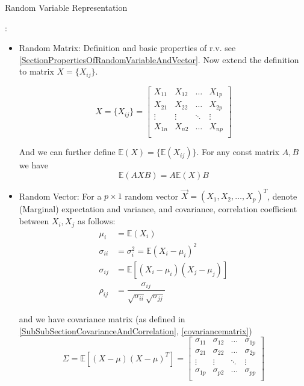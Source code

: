 \begin{point}
    \hypertarget{RandomVariableRepresentation}{Random Variable Representation}:
\end{point}
    \begin{itemize}[topsep=6pt,itemsep=4pt]
        \item Random Matrix: Definition and basic properties of r.v. see \autoref{SectionPropertiesOfRandomVariableAndVector}. Now extend the definition to matrix $ X=\{X_{ij}\} $. 
    
    \begin{equation}
        X=\{X_{ij}\}=\begin{bmatrix}
        X_{11}&X_{12}&\ldots&X_{1p}\\
        X_{21}&X_{22}&\ldots&X_{2p}\\
        \vdots&\vdots&\ddots&\vdots\\
        X_{1n}&X_{n2}&\ldots&X_{np}\\
        \end{bmatrix} 
    \end{equation}

    And we can further define $ \mathbb{E}(X)=\{\mathbb{E}(X_{ij})\} $.
    For any const matrix $ A,B $ we have
    \begin{equation}
        \mathbb{E}(AXB)=A\mathbb{E}(X)B 
    \end{equation}

    \item Random Vector: For a $ p\times 1 $ random vector $ \vec{X}=(X_{1},X_{2},\ldots,X_{p})^T  $, denote (Marginal) expectation and variance, and covariance, correlation coefficient between $ X_i,X_j $ as follows:
    \begin{align*}
        \mu_i&=\mathbb{E}(X_i)\\
        \sigma _{ii}&=\sigma_i ^2=\mathbb{E}(X_i-\mu_i)^2\\
        \sigma_{ij}&=\mathbb{E}[(X_i-\mu_i)(X_j-\mu_j)]\\
        \rho _{ij}&=\dfrac{\sigma _{ij}}{\sqrt{\sigma _{ii}}\sqrt{\sigma _{jj}}}
    \end{align*}
    
    and we have covariance matrix (as defined in \autoref{SubSubSectionCovarianceAndCorrelation}, \autoref{covariancematrix})
    \begin{equation}
        \Sigma =\mathbb{E}[(X-\mu)(X-\mu)^T] =
        \begin{bmatrix}
        \sigma _{11}&\sigma _{12}&\ldots&\sigma _{1p}\\
        \sigma _{21}&\sigma _{22}&\ldots&\sigma _{2p}\\
        \vdots&\vdots&\ddots&\vdots\\
        \sigma _{1p}&\sigma _{p2}&\ldots&\sigma _{pp}\\
        \end{bmatrix}
    \end{equation}


\end{itemize}
